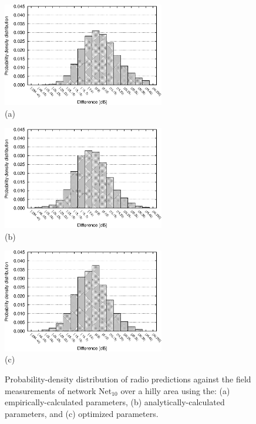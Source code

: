 \begin{figure}
\centering

\includegraphics[width=0.63\textwidth]{05-framework_parameter_tuning/img/hilly-default_distribution}\\\hspace*{0.3in}(a)\vspace{5mm}

\includegraphics[width=0.63\textwidth]{05-framework_parameter_tuning/img/hilly-fitted_distribution}\\\hspace*{0.3in}(b)\vspace{5mm}

\includegraphics[width=0.63\textwidth]{05-framework_parameter_tuning/img/hilly-optim_distribution}\\\hspace*{0.3in}(c)\vspace{5mm}

\caption{Probability-density distribution of radio predictions against the
field measurements of network Net$_{10}$ over a hilly area using
the: (a) empirically-calculated parameters, (b) analytically-calculated
parameters, and (c) optimized parameters.\label{fig:05-Error_distribution_for_Net10}}
\end{figure}



